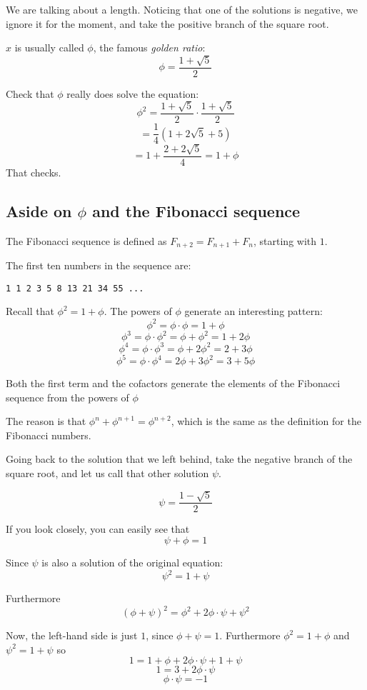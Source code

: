 \documentclass[11pt, oneside]{article}
\begin{document}
We are talking about a length.  Noticing that one of the solutions is negative, we ignore it for the moment, and take the positive branch of the square root.

$x$ is usually called $\phi$, the famous \emph{golden ratio}:
\[ \phi = \frac{1 + \sqrt{5}}{2} \]

Check that $\phi$ really does solve the equation:
\[ \phi^2 =  \frac{1 + \sqrt{5}}{2} \cdot  \frac{1 + \sqrt{5}}{2} \]
\[ = \frac{1}{4} (1 + 2 \sqrt{5} + 5) \]
\[ = 1 + \frac{2 + 2 \sqrt{5}}{4} = 1 + \phi \]
That checks.  

\subsection*{Aside on $\phi$ and the Fibonacci sequence}

The Fibonacci sequence is defined as $F_{n+2} = F_{n+1} + F_n$, starting with $1$.  

The first ten numbers in the sequence are:
\begin{verbatim}
1 1 2 3 5 8 13 21 34 55 ...
\end{verbatim}

Recall that $\phi^2 = 1 + \phi$.  The powers of $\phi$ generate an interesting pattern:
\[ \phi^2 = \phi \cdot \phi = 1 + \phi \]
\[ \phi^3 = \phi \cdot \phi^2 = \phi + \phi^2 = 1 + 2 \phi \]
\[ \phi^4 = \phi \cdot \phi^3 = \phi + 2 \phi^2 = 2 + 3 \phi \]
\[ \phi^5 = \phi \cdot \phi^4 = 2 \phi + 3 \phi^2 = 3 + 5 \phi \]

Both the first term and the cofactors generate the elements of the Fibonacci sequence from the powers of $\phi$

The reason is that $\phi^n + \phi^{n+1} = \phi^{n+2}$, which is the same as the definition for the Fibonacci numbers.

Going back to the solution that we left behind, take the negative branch of the square root, and let us call that other solution $\psi$.  

\[ \psi = \frac{1 - \sqrt{5}}{2} \]

If you look closely, you can easily see that
\[ \psi + \phi = 1 \]

Since $\psi$ is also a solution of the original equation:
\[ \psi^2 = 1 + \psi \]

Furthermore
\[ (\phi + \psi)^2 = \phi^2 + 2 \phi \cdot \psi + \psi^2 \]

Now, the left-hand side is just $1$, since $\phi + \psi = 1$.  Furthermore $\phi^2 = 1 + \phi$ and $\psi^2 = 1 + \psi$ so
\[ 1 = 1 + \phi + 2 \phi \cdot \psi + 1 + \psi \]
\[ 1 = 3 + 2  \phi \cdot \psi  \]
\[ \phi \cdot \psi = -1 \]
\end{document}
